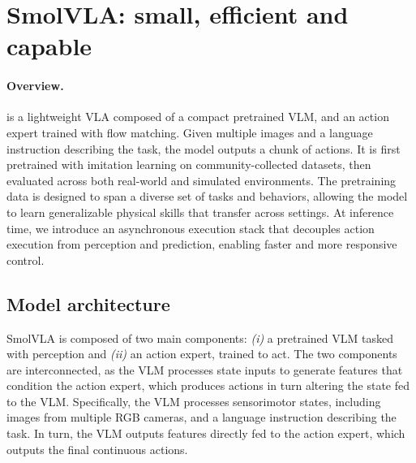 \newcommand{\actionchunk}{\mathbf{A}}
\newcommand{\actionexpert}{\mathbf{v}_\theta}

\section{SmolVLA: small, efficient and capable}

\paragraph{Overview.}
\ours is a lightweight VLA composed of a compact pretrained VLM, and an action expert trained with flow matching. 
Given multiple images and a language instruction describing the task, the model outputs a chunk of actions. 
It is first pretrained with imitation learning on community-collected datasets, then evaluated across both real-world and simulated environments. 
The pretraining data is designed to span a diverse set of tasks and behaviors, allowing the model to learn generalizable physical skills that transfer across settings. 
At inference time, we introduce an asynchronous execution stack that decouples action execution from perception and prediction, enabling faster and more responsive control.

\subsection{Model architecture}
SmolVLA is composed of two main components: \emph{(i)} a pretrained VLM tasked with perception and \emph{(ii)} an action expert, trained to act. 
The two components are interconnected, as the VLM processes state inputs to generate features that condition the action expert, which produces actions in turn altering the state fed to the VLM. 
Specifically, the VLM processes sensorimotor states, including images from multiple RGB cameras, and a language instruction describing the task. In turn, the VLM outputs features directly fed to the action expert, which outputs the final continuous actions.

